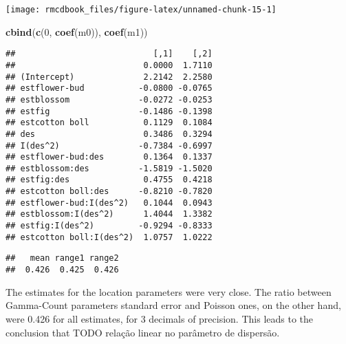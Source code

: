 \documentclass[9pt,a5paper,]{book}
\newenvironment{Shaded}{}{}
\newcommand{\KeywordTok}[1]{\textbf{{#1}}}
\newcommand{\DecValTok}[1]{{#1}}
\newcommand{\StringTok}[1]{{#1}}
\newcommand{\NormalTok}[1]{{#1}}
\renewenvironment{Shaded}{\color{inputcolor}}{}
\theoremstyle{definition}
\theoremstyle{definition}
\theoremstyle{remark}
\begin{document}
\begin{center}\texttt{[image: rmcdbook\_files/figure-latex/unnamed-chunk-15-1]} \end{center}

\begin{Shaded}
\begin{Highlighting}[]
\KeywordTok{cbind}\NormalTok{(}\KeywordTok{c}\NormalTok{(}\DecValTok{0}\NormalTok{, }\KeywordTok{coef}\NormalTok{(m0)), }\KeywordTok{coef}\NormalTok{(m1))}
\end{Highlighting}
\end{Shaded}

\begin{verbatim}
##                            [,1]    [,2]
##                          0.0000  1.7110
## (Intercept)              2.2142  2.2580
## estflower-bud           -0.0800 -0.0765
## estblossom              -0.0272 -0.0253
## estfig                  -0.1486 -0.1398
## estcotton boll           0.1129  0.1084
## des                      0.3486  0.3294
## I(des^2)                -0.7384 -0.6997
## estflower-bud:des        0.1364  0.1337
## estblossom:des          -1.5819 -1.5020
## estfig:des               0.4755  0.4218
## estcotton boll:des      -0.8210 -0.7820
## estflower-bud:I(des^2)   0.1044  0.0943
## estblossom:I(des^2)      1.4044  1.3382
## estfig:I(des^2)         -0.9294 -0.8333
## estcotton boll:I(des^2)  1.0757  1.0222
\end{verbatim}

\begin{Shaded}
\end{Shaded}

\begin{verbatim}
##   mean range1 range2 
##  0.426  0.425  0.426
\end{verbatim}

The estimates for the location parameters were very close. The ratio
between Gamma-Count parameters standard error and Poisson ones, on the
other hand, were 0.426 for all estimates, for 3 decimals of precision.
This leads to the conclusion that TODO relação linear no parâmetro de
dispersão.
\end{document}
